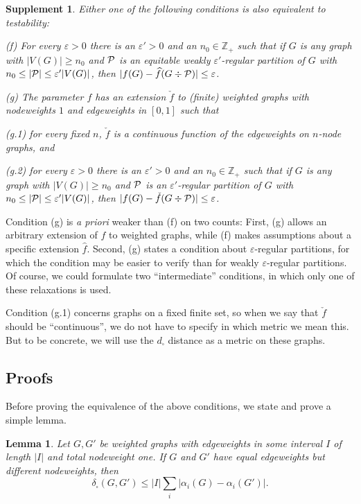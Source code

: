\documentclass[12pt]{article}
\newtheorem{lemma}[theorem]{Lemma}
\newtheorem{suppl}[theorem]{Supplement}
\numberwithin{equation}{section}
\def\eps{\varepsilon}
\def\iv{\widehat}
\def\Z{{\mathbb Z}}
\def\PP{{\cal P}}\def\QQ{{\cal Q}}\def\RR{{\cal R}}
\begin{document}
\begin{suppl}\label{CONT-INF-SUPP2}
Either one of the following conditions is also equivalent to
testability:

\medskip

{\rm (f)} For every $\eps>0$ there is an $\eps'>0$  and an
$n_0\in\Z_+$ such that if $G$ is any graph with $|V(G)|\ge n_0$ and
$\PP$ is an equitable weakly $\eps'$-regular partition of $G$ with
$n_0\leq |\PP|\leq \eps'|V(G)|$, then
$|f(G)-\iv{f}(G\div\PP)|\le\eps$.

\medskip

{\rm (g)} The parameter $f$ has an extension $\check{f}$ to (finite)
weighted graphs with nodeweights $1$ and edgeweights in $[0,1]$ such
that

\smallskip

{\rm (g.1)} for every fixed $n$, $\check{f}$ is a continuous function
of the edgeweights on $n$-node graphs, and

\smallskip

{\rm (g.2)} for every $\eps>0$ there is an $\eps'>0$  and an
$n_0\in\Z_+$ such that if $G$ is any graph with $|V(G)|\ge n_0$ and
$\PP$ is an $\eps'$-regular partition of $G$ with $n_0\leq |\PP|\leq
\eps'|V(G)|$, then $|f(G)-\check{f}(G\div\PP)|\le\eps$.
\end{suppl}

Condition (g) is {\it a priori} weaker than (f) on two counts:
First, (g) allows an arbitrary extension of $f$ to weighted graphs,
while (f) makes assumptions about a specific extension
$\widehat{f}$. Second, (g) states a condition about $\eps$-regular
partitions, for which the condition may be easier to verify than for
weakly $\eps$-regular partitions. Of course, we could formulate two
``intermediate'' conditions, in which only one of these relaxations
is used.

Condition (g.1) concerns graphs on a fixed finite set, so when we say
that $\check{f}$ should be ``continuous'', we do not have to specify
in which metric we mean this. But to be concrete, we will use the
$d_\square$ distance as a metric on these graphs.

\subsection{Proofs}

Before proving the equivalence of the above conditions, we state and
prove a simple lemma.


\begin{lemma}\label{lem:diff-vert-weights}
Let $G,G'$ be weighted graphs with edgeweights in some interval
$I$ of length $|I|$
and total nodeweight one.
If $G$ and $G'$ have equal
edgeweights but different nodeweights,
then
\[
\delta_\square(G,G')\leq
|I|\sum_i|\alpha_i(G)-\alpha_i(G')|.
\]
\end{lemma}
\end{document}
